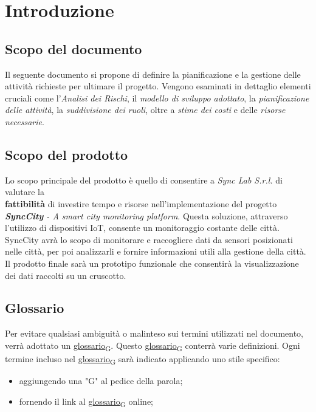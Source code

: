\section{Introduzione}
\setcounter{subsection}{0}
\subsection{Scopo del documento}
Il seguente documento si propone di definire la pianificazione e la gestione delle attività richieste per ultimare il progetto. Vengono esaminati in dettaglio elementi cruciali come l’\textit{Analisi dei Rischi}, il \textit{modello di sviluppo adottato}, la \textit{pianificazione delle attività}, la \textit{suddivisione dei ruoli}, oltre a \textit{stime dei costi} e delle \textit{risorse necessarie}.

\subsection{Scopo del prodotto}
Lo scopo principale del prodotto è quello di consentire a \textit{Sync Lab S.r.l.} di valutare la \\\textbf{fattibilità} di investire tempo e risorse nell'implementazione del progetto  \textit{\textbf{SyncCity} - A smart city monitoring platform}. Questa soluzione, attraverso l'utilizzo di dispositivi IoT, consente un monitoraggio costante delle città. SyncCity avrà lo scopo di monitorare e raccogliere dati da sensori posizionati nelle città, per poi analizzarli e fornire informazioni utili alla gestione della città. Il prodotto finale sarà un prototipo funzionale che consentirà la visualizzazione dei dati raccolti su un cruscotto.

\subsection{Glossario}
Per evitare qualsiasi ambiguità o malinteso sui termini utilizzati nel documento, verrà adottato un \href{https://7last.github.io/docs/rtb/documentazione-interna/glossario#glossario}{glossario\textsubscript{G}}. Questo \href{https://7last.github.io/docs/rtb/documentazione-interna/glossario#glossario}{glossario\textsubscript{G}} conterrà varie definizioni. Ogni termine incluso nel \href{https://7last.github.io/docs/rtb/documentazione-interna/glossario#glossario}{glossario\textsubscript{G}} sarà indicato applicando uno stile specifico:
\begin{itemize}
    \item aggiungendo una "G" al pedice della parola;
    \item fornendo il link al \href{https://7last.github.io/docs/rtb/documentazione-interna/glossario#glossario}{glossario\textsubscript{G}} online;
\end{itemize}

